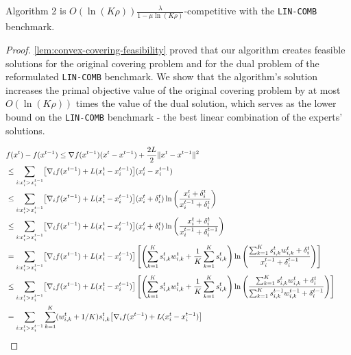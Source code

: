\begin{theorem} \label{convex-covering-theorem}
Algorithm 2 is $O(\ln(K \rho)) \frac{\lambda}{1 - \mu \ln (K\rho)}$-competitive with the \texttt{LIN-COMB} benchmark.
\end{theorem}
%
\begin{proof} \cref{lem:convex-covering-feasibility} proved that our algorithm creates feasible solutions for the original covering problem and for the dual problem of the reformulated \texttt{LIN-COMB} benchmark. We show that the algorithm's solution increases the primal objective value of the original covering problem by at most $O(\ln(K \rho))$ times the value of the dual solution, which serves as the lower bound on the \texttt{LIN-COMB} benchmark - the best linear combination of the experts' solutions.

\begin{align}
&f(x^{t}) - f(x^{t-1}) \leq \nabla f(x^{t-1}) (x^{t} - x^{t-1}) + \frac{2L}{2} \|x^{t} - x^{t-1} \|^{2} \\
%
&\leq \sum_{i: x_{i}^{t} > x_{i}^{t-1}} \bigl[ \nabla_{i} f(x^{t-1}) + L(x_{i}^{t} - x_{i}^{t-1}) \bigr] (x_{i}^{t} - x_{i}^{t-1}) &&  \notag \\
%
&\leq \sum_{i: x_{i}^{t} > x_{i}^{t-1}} \bigl[ \nabla_{i} f(x^{t-1}) + L(x_{i}^{t} - x_{i}^{t-1}) \bigr](x_{i}^{t} + \delta_{i}^{t}) \ln \left(\frac{x_{i}^{t} + \delta_{i}^{t}}{x_{i}^{t-1} + \delta_{i}^{t}} \right) \\
%
&\leq \sum_{i: x_{i}^{t} > x_{i}^{t-1}} \bigl[ \nabla_{i} f(x^{t-1}) + L(x_{i}^{t} - x_{i}^{t-1}) \bigr] (x_{i}^{t} + \delta_{i}^{t}) \ln \left(\frac{x_{i}^{t} + \delta_{i}^{t}}{x_{i}^{t-1} + \delta_{i}^{t-1}} \right) \\
%
&= \sum_{i: x_{i}^{t} > x_{i}^{t-1}} \bigl[ \nabla_{i} f(x^{t-1}) + L(x_{i}^{t} - x_{i}^{t-1}) \bigr] \left[ \left(\sum_{k=1}^{K}  s_{i,k}^{t} w_{i,k}^{t} + \frac{1}{K} \sum_{k=1}^{K} s_{i,k}^{t} \right)
            \ln \left(\frac{ \sum_{k=1}^{K}  s_{i,k}^{t} w_{i,k}^{t} + \delta_{i}^{t}}{x_{i}^{t-1} + \delta_{i}^{t-1}}  \right) \right]\\
%
&\leq \sum_{i: x_{i}^{t} > x_{i}^{t-1}} \bigl[ \nabla_{i} f(x^{t-1}) + L(x_{i}^{t} - x_{i}^{t-1}) \bigr] \left[ \left(\sum_{k=1}^{K}  s_{i,k}^{t} w_{i,k}^{t} + \frac{1}{K} \sum_{k=1}^{K} s_{i,k}^{t} \right)
            \ln \left(\frac{ \sum_{k=1}^{K}  s_{i,k}^{t} w_{i,k}^{t} + \delta_{i}^{t}}{\sum_{k=1}^{K}  s_{i,k}^{t-1} w_{i,k}^{t-1} + \delta_{i}^{t-1}}  \right) \right]\\
%
&= \sum_{i: x_{i}^{t} > x_{i}^{t-1}} \sum_{k=1}^{K} (w_{i,k}^{t} + 1/K) s_{i,k}^{t} \bigl[ \nabla_{i} f(x^{t-1}) + L(x_{i}^{t} - x_{i}^{t-1}) \bigr]

\end{align}
\end{proof}
